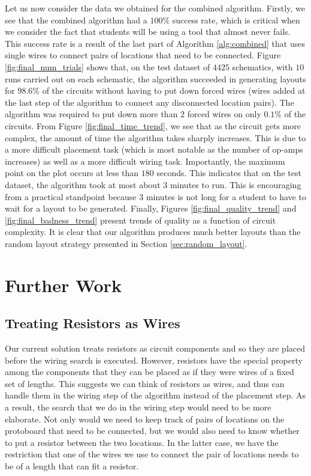 Let us now consider the data we obtained for the combined algorithm. Firstly, we
see that the combined algorithm had a $100\%$ success rate, which is critical
when we consider the fact that students will be using a tool that almost never
fails. This success rate is a result of the last part of Algorithm
\ref{alg:combined} that uses single wires to connect pairs of locations that
need to be connected.
Figure \ref{fig:final_num_trials} shows that, on the test dataset of $4425$
schematics, with $10$ runs carried out on each schematic, the algorithm succeeded
in generating layouts for $98.6\%$ of the circuits without having to put down
forced wires (wires added at the last step of the algorithm to connect any
disconnected location pairs). The algorithm was
required to put down more than $2$ forced wires on only $0.1\%$ of the circuits.
From Figure
\ref{fig:final_time_trend}, we see that as the circuit gets more complex, the
amount of time the algorithm takes sharply increases. This is due to a more
difficult placement task (which is most notable as the number of op-amps
increases) as well as a more
difficult wiring task. Importantly, the maximum
point on the plot occurs at less than $180$ seconds. This indicates that on the
test dataset, the algorithm took at most about $3$ minutes to run. This is
encouraging from a practical standpoint because $3$ minutes is not long
for a student to have to wait for a layout to be generated.
Finally, Figures \ref{fig:final_quality_trend} and \ref{fig:final_badness_trend}
present trends of quality as a
function of circuit complexity. It is clear that our algorithm produces
much better layouts than the random layout strategy presented in Section
\ref{sec:random_layout}.

\newpage\section{Further Work}

\subsection{Treating Resistors as Wires}

Our current solution treats resistors as circuit components and so they are
placed before the wiring search is executed.
However, resistors have the special property among the components that
they can be placed as if they were wires of a fixed set of lengths.
This suggests we can think of resistors as wires,
and thus can handle them in the wiring step of the algorithm instead of
the placement step. As a result, the search that we do in the wiring step would
need to be
more elaborate. Not only would we need to keep track of pairs of locations on the
protoboard that need to be connected, but we would also need to know whether to
put a resistor between the two locations. In the latter case, we have the
restriction that one of the wires we use to connect the pair of locations needs
to be of a length that can fit a resistor.

